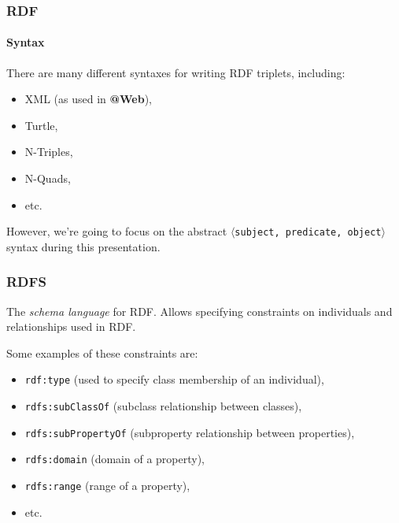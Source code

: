 \documentclass{beamer}
\makeatletter
\newcommand{\atweb}{\textbf{@Web}\xspace}
\newcommand{\triplet}[1]{$\langle$\texttt{#1}$\rangle$}
\makeatother
\begin{document}
\begin{frame}
  \frametitle{RDF}
  \framesubtitle{Syntax}

  There are many different syntaxes for writing RDF triplets, including:

  \pause

  \begin{itemize}
    \item XML (as used in \atweb),

    \pause

    \item Turtle,
    \item N-Triples,
    \item N-Quads,
    \item etc.
  \end{itemize}

  \pause

  However, we're going to focus on the abstract \triplet{subject, predicate,
  object} syntax during this presentation.
\end{frame}

\begin{frame}
  \frametitle{RDFS}

  The \textit{schema language} for RDF. Allows specifying constraints on
  individuals and relationships used in RDF.

  \pause

  \medskip

  Some examples of these constraints are:

  \pause

  \begin{itemize}
    \item \texttt{rdf:type} (used to specify class membership of an individual),
    \item \texttt{rdfs:subClassOf} (subclass relationship between classes),
    \item \texttt{rdfs:subPropertyOf} (subproperty relationship between
      properties),
    \item \texttt{rdfs:domain} (domain of a property),
    \item \texttt{rdfs:range} (range of a property),
    \item etc.
  \end{itemize}
\end{frame}
\end{document}

